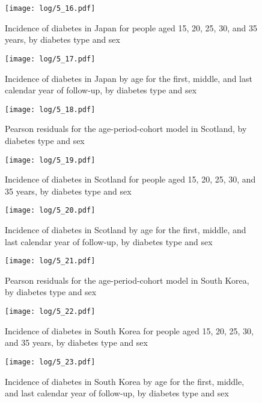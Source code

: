 \documentclass[11pt]{article}
\begin{document}
\begin{figure}
    \centering
    \texttt{[image: log/5\_16.pdf]}
    \caption{Incidence of diabetes in Japan for people aged 15, 20, 25, 30, and 35 years, by diabetes type and sex}
    \label{Japan agespec}
\end{figure}
\begin{figure}
    \centering
    \texttt{[image: log/5\_17.pdf]}
    \caption{Incidence of diabetes in Japan by age for the first, middle, and last calendar year of follow-up, by diabetes type and sex}
    \label{Japan agespec}
\end{figure}
\begin{figure}
    \centering
    \texttt{[image: log/5\_18.pdf]}
    \caption{Pearson residuals for the age-period-cohort model in Scotland, by diabetes type and sex}
    \label{Scotland agespec}
\end{figure}
\begin{figure}
    \centering
    \texttt{[image: log/5\_19.pdf]}
    \caption{Incidence of diabetes in Scotland for people aged 15, 20, 25, 30, and 35 years, by diabetes type and sex}
    \label{Scotland agespec}
\end{figure}
\begin{figure}
    \centering
    \texttt{[image: log/5\_20.pdf]}
    \caption{Incidence of diabetes in Scotland by age for the first, middle, and last calendar year of follow-up, by diabetes type and sex}
    \label{Scotland agespec}
\end{figure}
\begin{figure}
    \centering
    \texttt{[image: log/5\_21.pdf]}
    \caption{Pearson residuals for the age-period-cohort model in South Korea, by diabetes type and sex}
    \label{South Korea agespec}
\end{figure}
\begin{figure}
    \centering
    \texttt{[image: log/5\_22.pdf]}
    \caption{Incidence of diabetes in South Korea for people aged 15, 20, 25, 30, and 35 years, by diabetes type and sex}
    \label{South Korea agespec}
\end{figure}
\begin{figure}
    \centering
    \texttt{[image: log/5\_23.pdf]}
    \caption{Incidence of diabetes in South Korea by age for the first, middle, and last calendar year of follow-up, by diabetes type and sex}
    \label{South Korea agespec}
\end{figure}
\begin{stlog}\end{stlog}
\color{black}
\end{document}
